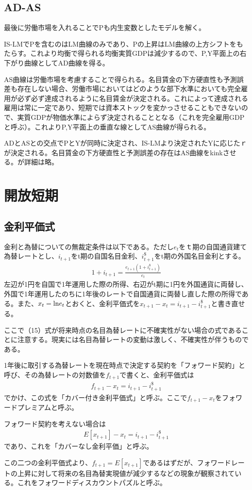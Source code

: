 \documentclass{jsarticle}
\begin{document}
\subsection{AD-AS}
最後に労働市場を入れることでPも内生変数としたモデルを解く。

IS-LMでPを含むのはLM曲線のみであり、Pの上昇はLM曲線の上方シフトをもたらす。これより均衡で得られる均衡実質GDPは減少するので、P,Y平面上の右下がり曲線としてAD曲線を得る。

AS曲線は労働市場を考慮することで得られる。名目賃金の下方硬直性も予測誤差も存在しない場合、労働市場においてはどのような部下水準においても完全雇用が必ず必ず達成されるように名目賃金が決定される。これによって達成される雇用は常に一定であり、短期では資本ストックを変かっさせることもできないので、実質GDPが物価水準によらず決定されることとなる（これを完全雇用GDPと呼ぶ）。これよりP,Y平面上の垂直な線としてAS曲線が得られる。

ADとASとの交点でPとYが同時に決定され、IS-LMより決定されたYに応じたｒが決定される。名目賃金の下方硬直性と予測誤差の存在はAS曲線をkinkさせる。が詳細は略。

\section{開放短期}
\subsection{金利平価式}
金利と為替についての無裁定条件は以下である。ただし$e_t$をｔ期の自国通貨建て為替レートとし、$i_{t+1}$をt期の自国名目金利、$i_{t+1}^{\$}$をt期の外国名目金利とする。
\begin{align}
	1 + i_{t+1} = \frac{e_{t+1}(1 + i_{t+1}^{\$})}{e_t}
\end{align}
左辺が1円を自国で1年運用した際の所得、右辺がt期に1円を外国通貨に両替し、外国で1年運用したのちに1年後のレートで自国通貨に両替し直した際の所得である。また、$x_t = {\rm ln} e_t$とおくと、金利平価式を$x_{t+1} - x_t = i_{t+1} - i_{t+1}^{\$}$と書き直せる。

ここで（15）式が将来時点の名目為替レートに不確実性がない場合の式であることに注意する。現実には名目為替レートの変動は激しく、不確実性が伴うものである。

1年後に取引する為替レートを現在時点で決定する契約を「フォワード契約」と呼び、その為替レートの対数値を$f_{t+1}$で書くと、金利平価式は
\begin{align*}
	f_{t + 1} - x_t = i_{t+1} - i_{t+1}^{\$}
\end{align*}
でかけ、この式を「カバー付き金利平価式」と呼ぶ。ここで$f_{t + 1} - x_t$をフォワードプレミアムと呼ぶ。

フォワード契約を考えない場合は
\begin{align*}
	E[x_{t + 1}] - x_t = i_{t+1} - i_{t+1}^{\$}
\end{align*}
であり、これを「カバーなし金利平価」と呼ぶ。

この二つの金利平価式より、$f_{t+1} = E[x_{t+1}]$であるはずだが、フォワードレートの上昇に対して将来の名目為替実現値が減少するなどの現象が観察されている。これをフォワードディスカウントパズルと呼ぶ。
\end{document}
